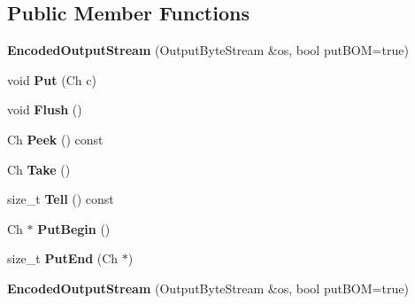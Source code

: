 \subsection*{Public Member Functions}
\begin{DoxyCompactItemize}
\item 
{\bfseries Encoded\+Output\+Stream} (Output\+Byte\+Stream \&os, bool put\+B\+OM=true)\hypertarget{class_encoded_output_stream_ad3360c613a30a6a15526ae9ad63bd004}{}\label{class_encoded_output_stream_ad3360c613a30a6a15526ae9ad63bd004}

\item 
void {\bfseries Put} (Ch c)\hypertarget{class_encoded_output_stream_a0f3c00f94c195a38d78c05ecda497481}{}\label{class_encoded_output_stream_a0f3c00f94c195a38d78c05ecda497481}

\item 
void {\bfseries Flush} ()\hypertarget{class_encoded_output_stream_a657188f6a9f0fae01a4012c288d3fd46}{}\label{class_encoded_output_stream_a657188f6a9f0fae01a4012c288d3fd46}

\item 
Ch {\bfseries Peek} () const \hypertarget{class_encoded_output_stream_aa1dbe6b921fe788f3229024fb5598647}{}\label{class_encoded_output_stream_aa1dbe6b921fe788f3229024fb5598647}

\item 
Ch {\bfseries Take} ()\hypertarget{class_encoded_output_stream_a90f5a5e1598316a417ef5b6ad3d49f36}{}\label{class_encoded_output_stream_a90f5a5e1598316a417ef5b6ad3d49f36}

\item 
size\+\_\+t {\bfseries Tell} () const \hypertarget{class_encoded_output_stream_ab580ac97f1a22c2a6abc4a31bb5c8272}{}\label{class_encoded_output_stream_ab580ac97f1a22c2a6abc4a31bb5c8272}

\item 
Ch $\ast$ {\bfseries Put\+Begin} ()\hypertarget{class_encoded_output_stream_a78934de4f76c9fa65238e65d3630cbc5}{}\label{class_encoded_output_stream_a78934de4f76c9fa65238e65d3630cbc5}

\item 
size\+\_\+t {\bfseries Put\+End} (Ch $\ast$)\hypertarget{class_encoded_output_stream_a818695f6d3fa8896e9d7d0fbdc7d4514}{}\label{class_encoded_output_stream_a818695f6d3fa8896e9d7d0fbdc7d4514}

\item 
{\bfseries Encoded\+Output\+Stream} (Output\+Byte\+Stream \&os, bool put\+B\+OM=true)\hypertarget{class_encoded_output_stream_ad3360c613a30a6a15526ae9ad63bd004}{}\label{class_encoded_output_stream_ad3360c613a30a6a15526ae9ad63bd004}


\end{DoxyCompactItemize}
